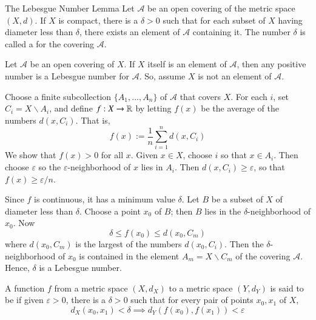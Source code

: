 \documentclass[12pt, a4paper, twoside, openright, titlepage]{book}
\begin{document}
\begin{lem}{The Lebesgue Number Lemma}{}
    Let $\mathcal{A}$ be an open covering of the metric space $(X,d)$. If $X$ is compact, there is a $\delta > 0$ such that for each subset of $X$ having diameter less than $\delta$, there exists an element of $\mathcal{A}$ containing it. The number $\delta$ is called a  for the covering $\mathcal{A}$.
\end{lem}
\begin{proof*}{}{}
    Let $\mathcal{A}$ be an open covering of $X$. If $X$ itself is an element of $\mathcal{A}$, then any positive number is a Lebesgue number for $\mathcal{A}$. So, assume $X$ is not an element of $\mathcal{A}$.

    Choose a finite subcollection $\{A_1,...,A_n\}$ of $\mathcal{A}$ that covers $X$. For each $i$, set $C_i = X\backslash A_i$, and define $f:X\rightarrow \mathbb R$ by letting $f(x)$ be the average of the numbers $d(x,C_i)$. That is, \begin{equation*}
        f(x) := \frac{1}{n}\sum\limits_{i=1}^nd(x,C_i)
    \end{equation*}
    We show that $f(x) > 0$ for all $x$. Given $x \in X$, choose $i$ so that $x \in A_i$. Then choose $\varepsilon$ so the $\varepsilon$-neighborhood of $x$ lies in $A_i$. Then $d(x,C_i)\geq \varepsilon$, so that $f(x) \geq \varepsilon/n$.

    Since $f$ is continuous, it has a minimum value $\delta$. Let $B$ be a subset of $X$ of diameter less than $\delta$. Choose a point $x_0$ of $B$; then $B$ lies in the $\delta$-neighborhood of $x_0$. Now \begin{equation*}
        \delta \leq f(x_0) \leq d(x_0,C_m)
    \end{equation*}
    where $d(x_0,C_m)$ is the largest of the numbers $d(x_0,C_i)$. Then the $\delta$-neighborhood of $x_0$ is contained in the element $A_m = X\backslash C_m$ of the covering $\mathcal{A}$. Hence, $\delta$ is a Lebesgue number.
\end{proof*}

\begin{defn}{}{}
    A function $f$ from a metric space $(X,d_X)$ to a metric space $(Y,d_Y)$ is said to be  if given $\varepsilon > 0$, there is a $\delta > 0$ such that for every pair of points $x_0,x_1$ of $X$, \begin{equation*}
        d_X(x_0,x_1)<\delta \implies d_Y(f(x_0),f(x_1)) < \varepsilon
    \end{equation*}
\end{defn}
\end{document}
